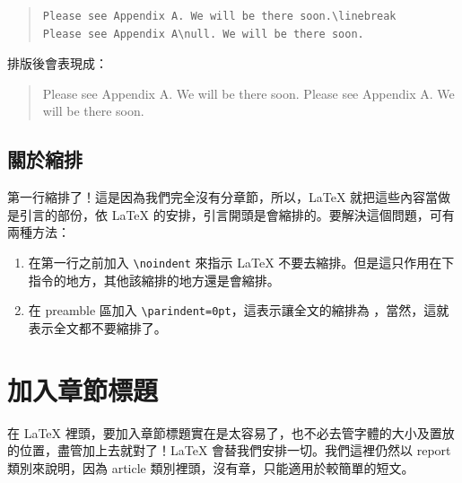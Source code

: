 \begin{quote}
   \begin{verbatim}
Please see Appendix A. We will be there soon.\linebreak
Please see Appendix A\null. We will be there soon.
\end{verbatim}
\end{quote}

排版後會表現成：

\begin{quote}
   Please see Appendix A. We will be there soon.\linebreak
   Please see Appendix A\null. We will be there soon.
\end{quote}

\subsection{關於縮排}

第一行縮排了！這是因為我們完全沒有分章節，所以，\LaTeX{} 就把這些內容當做是引言的部份，依 \LaTeX{} 的安排，引言開頭是會縮排的。要解決這個問題，可有兩種方法：

\begin{enumerate}
   \item 在第一行之前加入 \verb|\noindent| 來指示 \LaTeX{} 不要去縮排。但是這只作用在下指令的地方，其他該縮排的地方還是會縮排。
   \item 在 preamble 區加入 \verb|\parindent=0pt|，這表示讓全文的縮排為 {\ttfamily 0pt}，當然，這就表示全文都不要縮排了。
\end{enumerate}

\section{加入章節標題}

在 \LaTeX{} 裡頭，要加入章節標題實在是太容易了，也不必去管字體的大小及置放的位置，盡管加上去就對了！\LaTeX{} 會替我們安排一切。我們這裡仍然以 {\ttfamily report} 類別來說明，因為 {\ttfamily article} 類別裡頭，沒有章，只能適用於較簡單的短文。

